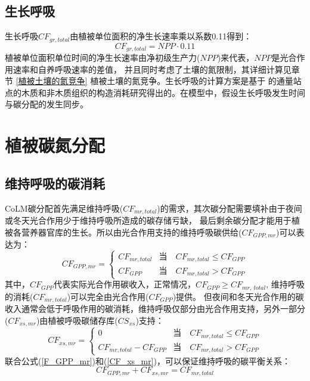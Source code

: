 \subsection{生长呼吸}\label{生长呼吸}
生长呼吸$CF_{gr,total}$由植被单位面积的净生长速率乘以系数0.11得到：
\begin{equation}
CF_{gr,total}=NPP \cdot 0.11
\end{equation}
植被单位面积单位时间的净生长速率由净初级生产力($NPP$)来代表，$NPP$是光合作用速率和自养呼吸速率的差值，
并且同时考虑了土壤的氮限制，其详细计算见章节 \ref{植被土壤的氮竞争} 植被土壤的氮竞争。生长呼吸的计算方案是基于\citet{atkins2018quantifying}
的通量站点的木质和非木质组织的构造消耗研究得出的。在模型中，假设生长呼吸发生时间与碳分配的发生同步。
\section{植被碳氮分配}\label{植被碳氮分配}
\subsection{维持呼吸的碳消耗}
CoLM碳分配首先满足维持呼吸($CF_{mr,total}$)的需求，其次碳分配需要填补由于夜间或冬天光合作用少于维持呼吸所造成的碳存储亏缺，
最后剩余碳分配才能用于植被各营养器官库的生长。所以由光合作用支持的维持呼吸碳供给($CF_{GPP,mr}$)可以表达为：
\begin{equation}\label{F_GPP_mr}
CF_{GPP,mr}=\left\{\begin{array}{cl}CF_{mr, total} & \text{当}\quad CF_{mr, total} \leq CF_{GPP} \\ CF_{GPP} & \text{当}\quad CF_{mr,total}>CF_{GPP} \end{array}\right.
\end{equation}
其中，$CF_{GPP}$代表实际光合作用碳收入，正常情况，$CF_{GPP}\geq CF_{mr,\ total}$,
维持呼吸的消耗($CF_{mr,total}$)可以完全由光合作用($CF_{GPP}$)提供。
但夜间和冬天光合作用的碳收入通常会低于呼吸作用的碳消耗，维持呼吸仅部分由光合作用支持，另外一部分($CF_{xs,mr}$)由植被呼吸碳储存库($CS_{xs}$)支持：
\begin{equation}\label{CF_xs_mr}
CF_{xs, mr}=\left\{\begin{array}{cl}0 & \text{当}\quad CF_{mr, total} \leq CF_{GPP} \\ CF_{mr, total}-CF_{GPP} & \text{当}\quad CF_{mr, total}>CF_{GPP}\end{array}\right.
\end{equation}
联合公式(\ref{F_GPP_mr})和(\ref{CF_xs_mr})，可以保证维持呼吸的碳平衡关系：
\begin{equation}
CF_{GPP, mr}+CF_{xs, mr}=CF_{mr, total}
\end{equation}



